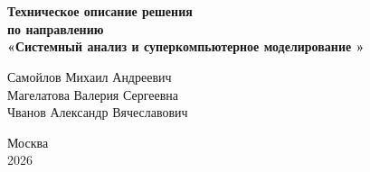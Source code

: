 \documentclass[a4paper,14pt]{extarticle}
\begin{document}


\thispagestyle{empty}
\begin{titlepage}
    \thispagestyle{empty}

    \begin{center}
        \textbf{} \\[0.5cm]
        \textbf{} \\[0.5cm]
        \textbf{}
    \end{center}

    \vspace{3cm}

    \begin{center}
        \textbf{\Large Техническое описание решения} \\[0.5cm]
        \textbf{\large по направлению} \\[0.5cm]
        \textbf{\Large «Системный анализ и суперкомпьютерное моделирование »}
    \end{center}

    \vspace{4cm}

    \begin{flushright}
        Самойлов Михаил Андреевич \\ 
        Магелатова Валерия Сергеевна \\ 
        Чванов Александр Вячеславович
    \end{flushright}

    \vfill

    

    \begin{center}
        Москва \\
        2026
    \end{center}

    
\end{titlepage}

\setcounter{page}{1}

\tableofcontents
\newpage

\end{document}
